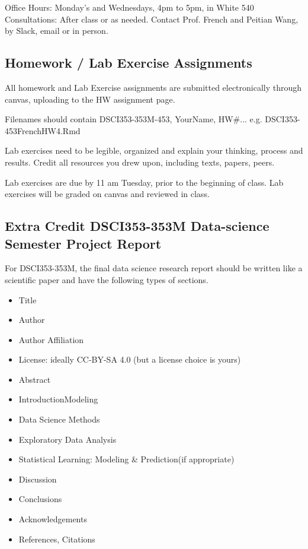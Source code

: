 \documentclass[11pt]{article} %
\begin{document}
    Office Hours: Monday's and Wednesdays, 4pm to 5pm, in White 540 
    Consultations: After class or as needed. Contact Prof. French and Peitian Wang, by Slack, email or in person. 
    
  
  \subsection{Homework / Lab Exercise Assignments}
    All homework and Lab Exercise assignments are submitted electronically through canvas, uploading to the HW assignment page.  
    
    Filenames should contain DSCI353-353M-453, YourName, HW\#... e.g. DSCI353-453FrenchHW4.Rmd
    
    Lab exercises need to be legible, organized and explain your thinking, process and results.
    Credit all resources you drew upon, including texts, papers, peers.
    
    Lab exercises are due by 11 am Tuesday, prior to the beginning of class.
    Lab exercises will be graded on canvas and reviewed in class.
    
    
  \subsection{Extra Credit DSCI353-353M Data-science Semester Project Report}
    For DSCI353-353M, the final data science research report should be written like a scientific paper and have the following types of sections. 
  
    \begin{itemize}
    	\item{Title}
    	\item{Author}
    	\item{Author Affiliation}
    	\item{ License: ideally CC-BY-SA 4.0  (but a license choice is yours)}
    \end{itemize}
    
    \begin{itemize}
    	\item{Abstract}
    	\item{Introduction}Modeling 
    	\item{Data Science Methods}
    	\item{Exploratory Data Analysis}
    	\item{Statistical Learning: Modeling \& Prediction(if appropriate)}
    	\item{Discussion}
    	\item{Conclusions}
    	\item{Acknowledgements}
    	\item{References, Citations}
    \end{itemize}
    
\end{document}
